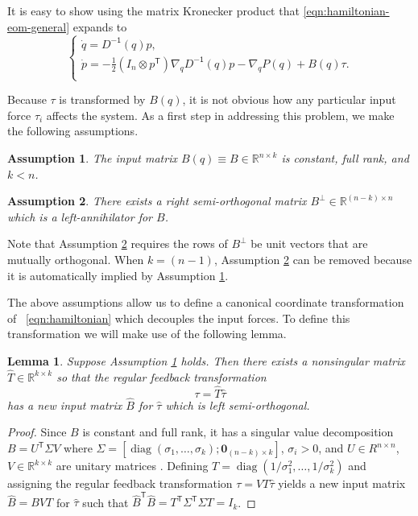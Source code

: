 \documentclass[journal,twoside,web]{ieeecolor}
\newtheorem{lemma}[thm]{Lemma} %
\newtheorem{assm}{Assumption} %
\DeclareMathOperator{\Diag}{diag}
\newcommand*{\diag}[1]{\Diag\left(#1\right)}
\newcommand*{\tpose}{^\mathsf{T}}
\newcommand*{\inv}{^\mathsf{-1}}
\newcommand*{\R}{\mathbb{R}}
\newcommand*{\Id}[1]{I_{#1}}
\newcommand*{\Zmat}[1]{\bm{0}_{#1}}
\begin{document}
It is easy to show using the matrix Kronecker product that
\eqref{eqn:hamiltonian-eom-general} expands to
\begin{equation}\label{eqn:hamiltonian-full-dynamics}
     \begin{cases}
        \dot{q} = D\inv(q)p 
        , \\
        \dot{p} = -\frac{1}{2} (\Id{n} \otimes p\tpose) \nabla_q D\inv(q) p
        - \nabla_q P(q) + B(q) \tau
        . \\
    \end{cases}
\end{equation}

Because \(\tau\) is transformed by \(B(q)\), it is not obvious how any
particular input force \(\tau_i\) affects the system.
As a first step in addressing this problem, we make the following assumptions.

\begin{assm}\label{assm:B-const}
    The input matrix \(B(q) \equiv B \in \R^{n\times k}\) is constant,
    full rank, and \(k < n\).
\end{assm}

\begin{assm}\label{assm:B-perp}
    There exists a right semi-orthogonal matrix 
    \(B^\perp \in \R^{(n-k)\times n}\)
    which is a left-annihilator for \(B\). 
\end{assm}

Note that Assumption \ref{assm:B-perp} requires the rows of \(B^\perp\) be unit vectors
that are mutually orthogonal. 
When \(k = (n-1)\), Assumption \ref{assm:B-perp} can be removed because it is
automatically implied by Assumption \ref{assm:B-const}.

The above assumptions allow us to define a
canonical coordinate transformation of ~\eqref{eqn:hamiltonian} 
which decouples the input forces.
To define this transformation we will make use of the following lemma.

\begin{lemma}\label{lemma:B-orthogonal}
    Suppose Assumption \ref{assm:B-const} holds. Then
    there exists a nonsingular matrix \(\hat{T} \in \R^{k \times k}\) 
    so that the regular feedback transformation 
    \[
        \tau = \hat{T} \hat{\tau}
    \] 
    has a new input matrix \(\hat{B}\) for \(\hat{\tau}\) which is left
    semi-orthogonal.  
\end{lemma}
\begin{proof}
    Since \(B\) is constant and full rank, it has a singular value decomposition 
    \(B = U\tpose \Sigma V\) where 
    \(\Sigma = [\diag{\sigma_1,\ldots,\sigma_k}; \Zmat{(n-k)\times k}]\),
    \(\sigma_i > 0\), and \(U \in R^{n \times n}\),
    \(V \in \R^{k \times k}\) are unitary matrices \cite{calculating_svd}.
    Defining \(T = \diag{1/\sigma_1^2,\ldots,1/\sigma_k^2}\) and assigning the
    regular feedback transformation \(\tau = V T \hat{\tau}\) yields a new input
    matrix \(\hat{B} = B V T\) for \(\hat{\tau}\) such that
    \(\hat{B}\tpose \hat{B} = T\tpose \Sigma\tpose \Sigma T = \Id{k}\).
\end{proof}
\end{document}
